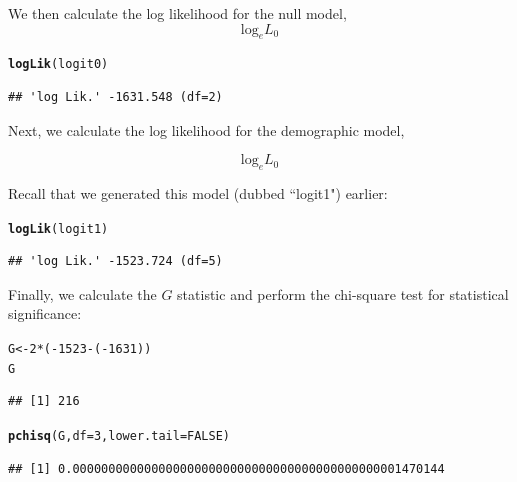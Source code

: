 \documentclass[11pt,openany]{book}\usepackage[]{graphicx}\usepackage[]{color}
\makeatletter
\newcommand{\hlnum}[1]{\textcolor[rgb]{0.686,0.059,0.569}{#1}}%
\newcommand{\hlopt}[1]{\textcolor[rgb]{0,0,0}{#1}}%
\newcommand{\hlstd}[1]{\textcolor[rgb]{0.345,0.345,0.345}{#1}}%
\newcommand{\hlkwb}[1]{\textcolor[rgb]{0.69,0.353,0.396}{#1}}%
\newcommand{\hlkwc}[1]{\textcolor[rgb]{0.333,0.667,0.333}{#1}}%
\newcommand{\hlkwd}[1]{\textcolor[rgb]{0.737,0.353,0.396}{\textbf{#1}}}%
\newenvironment{kframe}{%
 \def\at@end@of@kframe{}%
 \ifinner\ifhmode%
  \def\at@end@of@kframe{\end{minipage}}%
  \begin{minipage}{\columnwidth}%
 \fi\fi%
 \def\FrameCommand##1{\hskip\@totalleftmargin \hskip-\fboxsep
 \colorbox{shadecolor}{##1}\hskip-\fboxsep
     \hskip-\linewidth \hskip-\@totalleftmargin \hskip\columnwidth}%
 \MakeFramed {\advance\hsize-\width
   \@totalleftmargin\z@ \linewidth\hsize
   \@setminipage}}%
 {\par\unskip\endMakeFramed%
 \at@end@of@kframe}
\newenvironment{knitrout}{}{} %
\renewenvironment{knitrout}{\begin{singlespace}}{\end{singlespace}}
\makeatother
\begin{document}
We then calculate the log likelihood for the null model, 
\begin{equation}\text{log}_e L_0\end{equation}

\begin{knitrout}
\color{fgcolor}\begin{kframe}
\begin{alltt}
\hlkwd{logLik}\hlstd{(logit0)}
\end{alltt}
\begin{verbatim}
## 'log Lik.' -1631.548 (df=2)
\end{verbatim}
\end{kframe}
\end{knitrout}

Next, we calculate the log likelihood for the demographic model, 

\begin{equation}\text{log}_e L_0\end{equation}

Recall that we generated this model (dubbed ``logit1") earlier:

\begin{knitrout}
\color{fgcolor}\begin{kframe}
\begin{alltt}
\hlkwd{logLik}\hlstd{(logit1)}
\end{alltt}
\begin{verbatim}
## 'log Lik.' -1523.724 (df=5)
\end{verbatim}
\end{kframe}
\end{knitrout}

Finally, we calculate the  $G$ statistic and perform the chi-square test for statistical significance:

\begin{knitrout}
\color{fgcolor}\begin{kframe}
\begin{alltt}
\hlstd{G} \hlkwb{<-} \hlnum{2} \hlopt{*} \hlstd{(}\hlopt{-}\hlnum{1523} \hlopt{-} \hlstd{(}\hlopt{-}\hlnum{1631}\hlstd{))}
\hlstd{G}
\end{alltt}
\begin{verbatim}
## [1] 216
\end{verbatim}
\begin{alltt}
\hlkwd{pchisq}\hlstd{(G,} \hlkwc{df} \hlstd{=} \hlnum{3}\hlstd{,} \hlkwc{lower.tail} \hlstd{=} \hlnum{FALSE}\hlstd{)}
\end{alltt}
\begin{verbatim}
## [1] 0.0000000000000000000000000000000000000000000001470144
\end{verbatim}
\end{kframe}
\end{knitrout}
\end{document}

